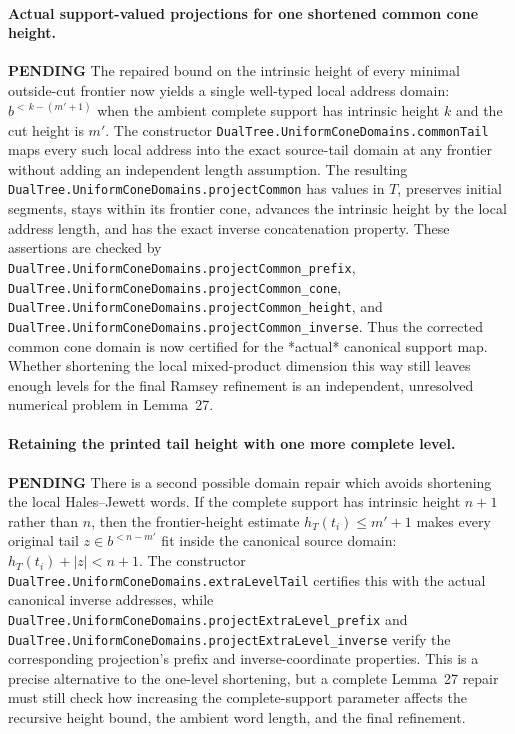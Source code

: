 \documentclass[11pt]{article}
\newcommand{\todo}{\textcolor{gray!70!black}{\textbf{PENDING}}}
\newcommand{\lean}[1]{\texttt{#1}}
\begin{document}
\paragraph{Actual support-valued projections for one shortened common cone height.} \todo
The repaired bound on the intrinsic height of every minimal outside-cut
frontier now yields a single well-typed local address domain:
$b^{<\,k-(m'+1)}$ when the ambient complete support has intrinsic
height $k$ and the cut height is $m'$.
The constructor \lean{DualTree.UniformConeDomains.commonTail}
maps every such local address into the exact source-tail domain
at any frontier without adding an independent length assumption.
The resulting
\lean{DualTree.UniformConeDomains.projectCommon} has values in $T$,
preserves initial segments, stays within its frontier cone, advances
the intrinsic height by the local address length, and has the exact
inverse concatenation property. These assertions are checked by
\lean{DualTree.UniformConeDomains.projectCommon_prefix},
\lean{DualTree.UniformConeDomains.projectCommon_cone},
\lean{DualTree.UniformConeDomains.projectCommon_height}, and
\lean{DualTree.UniformConeDomains.projectCommon_inverse}.
Thus the corrected common cone domain is now certified for the
*actual* canonical support map. Whether shortening the local
mixed-product dimension this way still leaves enough levels for
the final Ramsey refinement is an independent, unresolved
numerical problem in Lemma~27.


\paragraph{Retaining the printed tail height with one more complete level.} \todo
There is a second possible domain repair which avoids shortening the
local Hales--Jewett words.  If the complete support has intrinsic
height $n+1$ rather than $n$, then the frontier-height estimate
$h_T(t_i)\le m'+1$ makes every original tail
$z\in b^{<n-m'}$ fit inside the canonical source domain:
$h_T(t_i)+|z|<n+1$.
The constructor \lean{DualTree.UniformConeDomains.extraLevelTail}
certifies this with the actual canonical inverse addresses, while
\lean{DualTree.UniformConeDomains.projectExtraLevel_prefix} and
\lean{DualTree.UniformConeDomains.projectExtraLevel_inverse}
verify the corresponding projection's prefix and inverse-coordinate
properties.  This is a precise alternative to the one-level
shortening, but a complete Lemma~27 repair must still check how
increasing the complete-support parameter affects the recursive
height bound, the ambient word length, and the final refinement.
\end{document}
